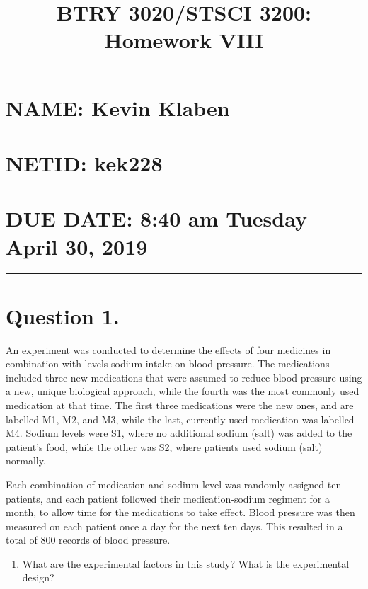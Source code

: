 \documentclass[]{article}
\title{BTRY 3020/STSCI 3200: Homework VIII}
\author{}
\date{}
\providecommand{\tightlist}{%
  \setlength{\itemsep}{0pt}\setlength{\parskip}{0pt}}
\begin{document}
\maketitle

\section{NAME: Kevin Klaben}\label{name-kevin-klaben}

\section{NETID: kek228}\label{netid-kek228}

\section{\texorpdfstring{\textbf{DUE DATE: 8:40 am Tuesday April 30,
2019}}{DUE DATE: 8:40 am Tuesday April 30, 2019}}\label{due-date-840-am-tuesday-april-30-2019}

\begin{center}\rule{0.5\linewidth}{\linethickness}\end{center}

\section{Question 1.}\label{question-1.}

An experiment was conducted to determine the effects of four medicines
in combination with levels sodium intake on blood pressure. The
medications included three new medications that were assumed to reduce
blood pressure using a new, unique biological approach, while the fourth
was the most commonly used medication at that time. The first three
medications were the new ones, and are labelled M1, M2, and M3, while
the last, currently used medication was labelled M4. Sodium levels were
S1, where no additional sodium (salt) was added to the patient's food,
while the other was S2, where patients used sodium (salt) normally.

Each combination of medication and sodium level was randomly assigned
ten patients, and each patient followed their medication-sodium regiment
for a month, to allow time for the medications to take effect. Blood
pressure was then measured on each patient once a day for the next ten
days. This resulted in a total of 800 records of blood pressure.

\begin{enumerate}
\def\labelenumi{\Alph{enumi})}
\tightlist
\item
  What are the experimental factors in this study? What is the
  experimental design?
\end{enumerate}
\end{document}
